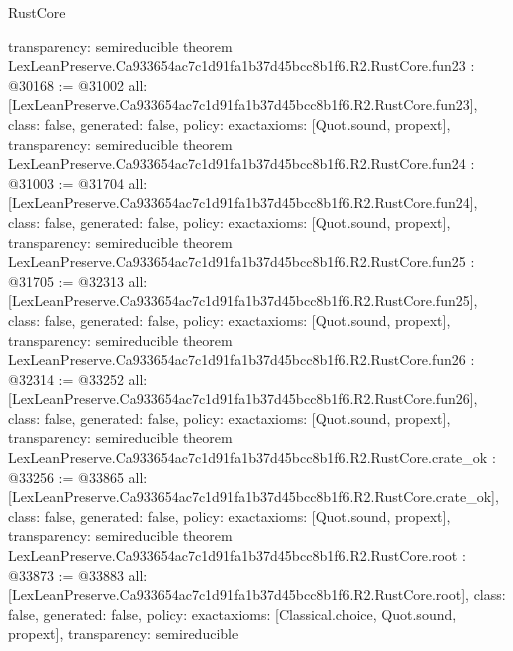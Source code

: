 \begin{lexlean}{RustCore}
\begin{coremodule}
{  transparency: semireducible
}
theorem LexLeanPreserve.Ca933654ac7c1d91fa1b37d45bcc8b1f6.R2.RustCore.fun23 : @30168 := @31002 {
  all: [LexLeanPreserve.Ca933654ac7c1d91fa1b37d45bcc8b1f6.R2.RustCore.fun23],
  class: false,
  generated: false,
  policy: exact{axioms: [Quot.sound, propext]},
  transparency: semireducible
}
theorem LexLeanPreserve.Ca933654ac7c1d91fa1b37d45bcc8b1f6.R2.RustCore.fun24 : @31003 := @31704 {
  all: [LexLeanPreserve.Ca933654ac7c1d91fa1b37d45bcc8b1f6.R2.RustCore.fun24],
  class: false,
  generated: false,
  policy: exact{axioms: [Quot.sound, propext]},
  transparency: semireducible
}
theorem LexLeanPreserve.Ca933654ac7c1d91fa1b37d45bcc8b1f6.R2.RustCore.fun25 : @31705 := @32313 {
  all: [LexLeanPreserve.Ca933654ac7c1d91fa1b37d45bcc8b1f6.R2.RustCore.fun25],
  class: false,
  generated: false,
  policy: exact{axioms: [Quot.sound, propext]},
  transparency: semireducible
}
theorem LexLeanPreserve.Ca933654ac7c1d91fa1b37d45bcc8b1f6.R2.RustCore.fun26 : @32314 := @33252 {
  all: [LexLeanPreserve.Ca933654ac7c1d91fa1b37d45bcc8b1f6.R2.RustCore.fun26],
  class: false,
  generated: false,
  policy: exact{axioms: [Quot.sound, propext]},
  transparency: semireducible
}
theorem LexLeanPreserve.Ca933654ac7c1d91fa1b37d45bcc8b1f6.R2.RustCore.crate_ok : @33256 := @33865 {
  all: [LexLeanPreserve.Ca933654ac7c1d91fa1b37d45bcc8b1f6.R2.RustCore.crate_ok],
  class: false,
  generated: false,
  policy: exact{axioms: [Quot.sound, propext]},
  transparency: semireducible
}
theorem LexLeanPreserve.Ca933654ac7c1d91fa1b37d45bcc8b1f6.R2.RustCore.root : @33873 := @33883 {
  all: [LexLeanPreserve.Ca933654ac7c1d91fa1b37d45bcc8b1f6.R2.RustCore.root],
  class: false,
  generated: false,
  policy: exact{axioms: [Classical.choice, Quot.sound, propext]},
  transparency: semireducible
}


\end{coremodule}
\end{lexlean}
